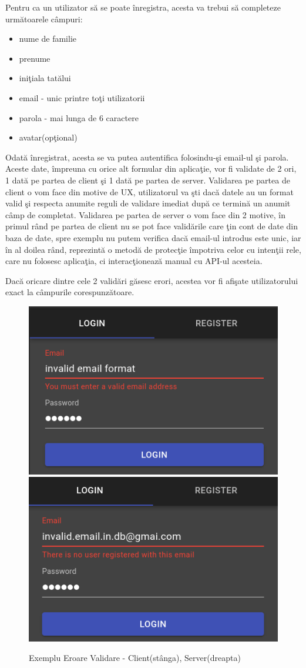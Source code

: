 \documentclass[12pt, a4paper, oneside, romanian]{teza-upb}
\begin{document}
Pentru ca un utilizator să se poate înregistra, acesta va trebui să completeze următoarele câmpuri:
\begin{itemize}
	\item nume de familie
	\item prenume
	\item iniţiala tatălui
	\item email - unic printre toţi utilizatorii
	\item parola - mai lunga de 6 caractere
	\item avatar(opţional)
\end{itemize}

Odată înregistrat, acesta se va putea autentifica folosindu-şi email-ul şi parola.\\

Aceste date, împreuna cu orice alt formular din aplicaţie, vor fi validate de 2 ori, 1 dată pe partea de client şi 1 dată pe partea de server. Validarea pe partea de client o vom face din motive de UX, utilizatorul va şti dacă datele au un format valid şi respecta anumite reguli de validare imediat după ce termină un anumit câmp de completat. Validarea pe partea de server o vom face din 2 motive, în primul rând pe partea de client nu se pot face validările care ţin cont de date din baza de date, spre exemplu nu putem verifica dacă email-ul introdus este unic, iar în al doilea rând, reprezintă o metodă de protecţie împotriva celor cu intenţii rele, care nu folosesc aplicaţia, ci interacţionează manual cu API-ul acesteia.

Dacă oricare dintre cele 2 validări găsesc erori, acestea vor fi afişate utilizatorului exact la câmpurile corespunzătoare.

\begin{figure}[H]
\centering
\includegraphics*[width=0.45\columnwidth]{exemplu-eroare-validare-frontend}
\includegraphics*[width=0.45\columnwidth]{exemplu-eroare-validare-backend}
\caption{Exemplu Eroare Validare - Client(stânga), Server(dreapta)}
\label{exemplu-eroare-validare}
\end{figure}
\end{document}
